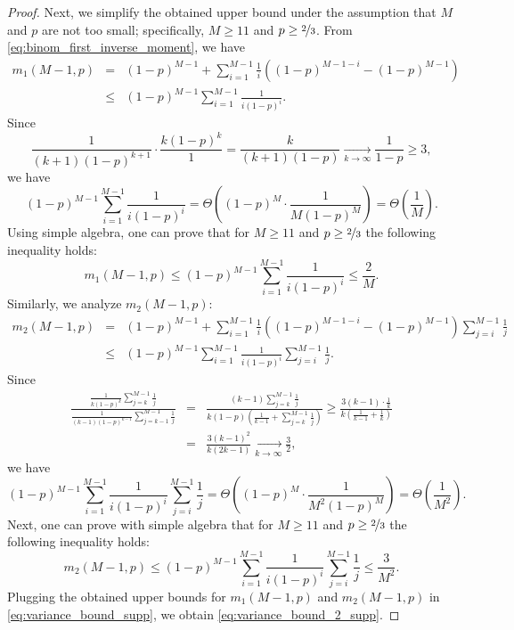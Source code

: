 \begin{proof}
Next, we simplify the obtained upper bound under the assumption that $M$ and $p$ are not too small; specifically, $M\ge 11$ and $p\ge \nicefrac{2}{3}$. From \eqref{eq:binom_first_inverse_moment}, we have
\begin{eqnarray*}
    m_1(M-1,p) &=& (1-p)^{M-1} + \sum\limits_{i=1}^{M-1}\frac{1}{i}\left((1-p)^{M-1-i} - (1-p)^{M-1}\right)\\
    &\le& (1-p)^{M-1}\sum\limits_{i=1}^{M-1}\frac{1}{i(1-p)^{i}}.
\end{eqnarray*}
Since
\begin{equation*}
    \frac{1}{(k+1)(1-p)^{k+1}}\cdot\frac{k(1-p)^k}{1} = \frac{k}{(k+1)(1-p)} \xrightarrow[k\to\infty]{}\frac{1}{1-p} \ge 3,
\end{equation*}
we have
\begin{equation*}
    (1-p)^{M-1}\sum\limits_{i=1}^{M-1}\frac{1}{i(1-p)^{i}} = \Theta\left((1-p)^M\cdot\frac{1}{M(1-p)^M}\right) = \Theta\left(\frac{1}{M}\right).
\end{equation*}
Using simple algebra, one can prove that for $M\ge 11$ and $p \ge\nicefrac{2}{3}$ the following inequality holds:
\begin{equation*}
    m_1(M-1,p)\le (1-p)^{M-1}\sum\limits_{i=1}^{M-1}\frac{1}{i(1-p)^{i}} \le \frac{2}{M}.
\end{equation*}
Similarly, we analyze $m_2(M-1, p)$:
\begin{eqnarray*}
    m_2(M-1,p) &=& (1-p)^{M-1} + \sum\limits_{i=1}^{M-1}\frac{1}{i}\left((1-p)^{M-1-i} - (1-p)^{M-1}\right)\sum\limits_{j=i}^{M-1}\frac{1}{j}\\
    &\le& (1-p)^{M-1}\sum\limits_{i=1}^{M-1}\frac{1}{i(1-p)^i}\sum\limits_{j=i}^{M-1}\frac{1}{j}.
\end{eqnarray*}
Since
\begin{eqnarray*}
    \frac{\frac{1}{k(1-p)^k}\sum\limits_{j=k}^{M-1}\frac{1}{j}}{\frac{1}{(k-1)(1-p)^{k-1}}\sum\limits_{j=k-1}^{M-1}\frac{1}{j}} &=& \frac{(k-1)\sum\limits_{j=k}^{M-1}\frac{1}{j}}{k(1-p)\left(\frac{1}{k-1} + \sum\limits_{j=k}^{M-1}\frac{1}{j}\right)} \ge \frac{3(k-1)\cdot\frac{1}{k}}{k\left(\frac{1}{k-1}+\frac{1}{k}\right)}\\
    &=& \frac{3(k-1)^2}{k(2k-1)}\xrightarrow[k\to\infty]{}  \frac{3}{2},
\end{eqnarray*}
we have
\begin{equation*}
    (1-p)^{M-1}\sum\limits_{i=1}^{M-1}\frac{1}{i(1-p)^i}\sum\limits_{j=i}^{M-1}\frac{1}{j} = \Theta\left((1-p)^M\cdot\frac{1}{M^2(1-p)^M}\right) = \Theta\left(\frac{1}{M^2}\right).
\end{equation*}
Next, one can prove with simple algebra that for $M\ge 11$ and $p \ge\nicefrac{2}{3}$ the following inequality holds:
\begin{equation*}
    m_2(M-1,p) \le (1-p)^{M-1}\sum\limits_{i=1}^{M-1}\frac{1}{i(1-p)^i}\sum\limits_{j=i}^{M-1}\frac{1}{j} \le \frac{3}{M^2}.
\end{equation*}
Plugging the obtained upper bounds for $m_1(M-1,p)$ and $m_2(M-1,p)$ in \eqref{eq:variance_bound_supp}, we obtain \eqref{eq:variance_bound_2_supp}.
\end{proof}
